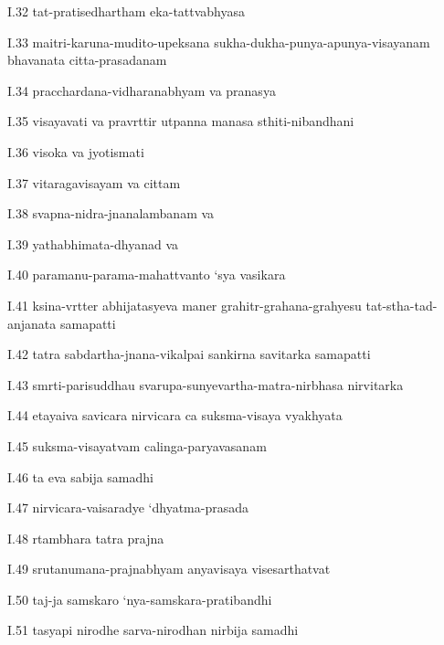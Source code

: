 I.32
tat-pratisedhartham eka-tattvabhyasa

I.33
maitri-karuna-mudito-upeksana sukha-dukha-punya-apunya-visayanam bhavanata citta-prasadanam

I.34
pracchardana-vidharanabhyam va pranasya

I.35
visayavati va pravrttir utpanna manasa sthiti-nibandhani

I.36
visoka va jyotismati

I.37
vitaragavisayam va cittam

I.38
svapna-nidra-jnanalambanam va

I.39
yathabhimata-dhyanad va

I.40
paramanu-parama-mahattvanto ‘sya vasikara

I.41
ksina-vrtter abhijatasyeva maner grahitr-grahana-grahyesu tat-stha-tad-anjanata samapatti

I.42
tatra sabdartha-jnana-vikalpai sankirna savitarka samapatti

I.43
smrti-parisuddhau svarupa-sunyevartha-matra-nirbhasa nirvitarka

I.44
etayaiva savicara nirvicara ca suksma-visaya vyakhyata

I.45
suksma-visayatvam calinga-paryavasanam

I.46
ta eva sabija samadhi

I.47
nirvicara-vaisaradye ‘dhyatma-prasada

I.48
rtambhara tatra prajna

I.49
srutanumana-prajnabhyam anyavisaya visesarthatvat

I.50
taj-ja samskaro ‘nya-samskara-pratibandhi

I.51
tasyapi nirodhe sarva-nirodhan nirbija samadhi
